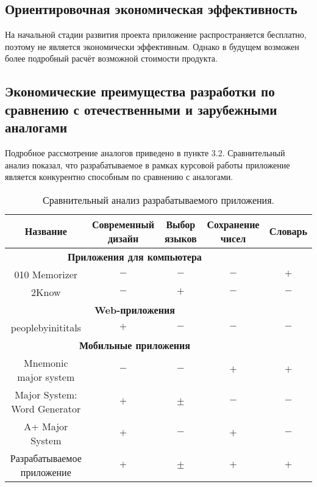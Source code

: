 \documentclass[draft]{article}
\begin{document}
\subsection{Ориентировочная экономическая эффективность}
На начальной стадии развития проекта приложение распространяется бесплатно, поэтому не является экономически эффективным. Однако в будущем возможен более подробный расчёт возможной стоимости продукта.
\subsection{Экономические преимущества разработки по сравнению с отечественными и
зарубежными аналогами}
Подробное рассмотрение аналогов приведено в пункте 3.2. Сравнительный анализ показал, что разрабатываемое в рамках курсовой работы приложение является конкурентно способным по сравнению с аналогами.
\begin{table}[H]
\caption{\label{tab:canonsummary}Сравнительный анализ разрабатываемого приложения.}
\begin{center}
\begin{tabular}{|c|c|c|c|c|}
\hline
\textbf{Название} & \textbf{Современный дизайн} & \textbf{Выбор языков} & \textbf{Сохранение чисел} & \textbf{Словарь}\\
\hline
\multicolumn{4}{|c|}{\textbf{Приложения для компьютера}} \\
\hline
010 Memorizer
& $-$
& $-$
& $-$
& $+$ \\
\hline
2Know
& $-$
& $+$
& $-$
& $-$ \\
\hline
\multicolumn{4}{|c|}{\textbf{Web-приложения}} \\
\hline
peoplebyinititals
& $+$
& $-$
& $-$
& $-$ \\
\hline
\multicolumn{4}{|c|}{\textbf{Мобильные приложения}} \\
\hline
Mnemonic major system
& $-$
& $-$
& $+$
& $+$ \\
\hline
Major System: Word Generator
& $+$
& $\pm$
& $-$
& $-$ \\
\hline
A+ Major System
& $+$
& $-$
& $+$
& $-$ \\
\hline
Разрабатываемое приложение
& $+$
& $\pm$
& $+$
& $+$ \\
\hline
\end{tabular}
\end{center}
\end{table} 
\newpage
{}
\end{document}
